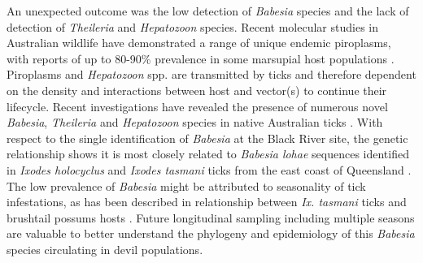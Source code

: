 \documentclass[a4paper, nobind]{templates/ociamthesis}
\begin{document}
An unexpected outcome was the low detection of \emph{Babesia} species and the lack of detection of \emph{Theileria} and \emph{Hepatozoon} species. Recent molecular studies in Australian wildlife have demonstrated a range of unique endemic piroplasms, with reports of up to 80-90\% prevalence in some marsupial host populations \autocite{rongHighPrevalenceTheileria2012,papariniFirstMolecularCharacterization2015,northoverIncreasedTrypanosomaSpp2019}. Piroplasms and \emph{Hepatozoon} spp. are transmitted by ticks and therefore dependent on the density and interactions between host and vector(s) to continue their lifecycle. Recent investigations have revealed the presence of numerous novel \emph{Babesia}, \emph{Theileria} and \emph{Hepatozoon} species in native Australian ticks \autocite{greayEndemicExoticNovel2018,lohMolecularSurveillancePiroplasms2018,storey-lewisMolecularDetectionCharacterisation2018}. With respect to the single identification of \emph{Babesia} at the Black River site, the genetic relationship shows it is most closely related to \emph{Babesia lohae} sequences identified in \emph{Ixodes holocyclus} and \emph{Ixodes tasmani} ticks from the east coast of Queensland \autocite{greayEndemicExoticNovel2018,lohMolecularSurveillancePiroplasms2018}. The low prevalence of \emph{Babesia} might be attributed to seasonality of tick infestations, as has been described in relationship between \emph{Ix. tasmani} ticks and brushtail possums hosts \autocite{murdochEcologyCommonMarsupial2005}. Future longitudinal sampling including multiple seasons are valuable to better understand the phylogeny and epidemiology of this \emph{Babesia} species circulating in devil populations.
\end{document}
